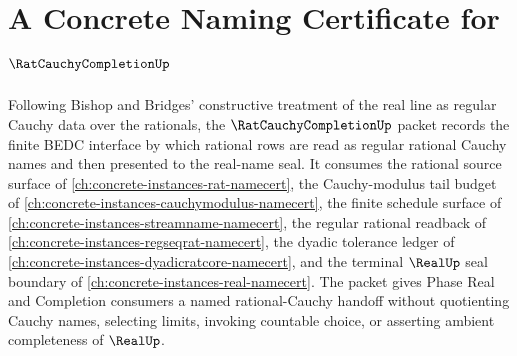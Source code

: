 \chapter{A Concrete Naming Certificate for $\RatCauchyCompletionUp$}
\label{ch:concrete-instances-rat-cauchy-completion-namecert}

Following Bishop and Bridges' constructive treatment of the real line as regular Cauchy data over the rationals, the $\RatCauchyCompletionUp$ packet records the finite BEDC interface by which rational rows are read as regular rational Cauchy names and then presented to the real-name seal. It consumes the rational source surface of \autoref{ch:concrete-instances-rat-namecert}, the Cauchy-modulus tail budget of \autoref{ch:concrete-instances-cauchymodulus-namecert}, the finite schedule surface of \autoref{ch:concrete-instances-streamname-namecert}, the regular rational readback of \autoref{ch:concrete-instances-regseqrat-namecert}, the dyadic tolerance ledger of \autoref{ch:concrete-instances-dyadicratcore-namecert}, and the terminal $\RealUp$ seal boundary of \autoref{ch:concrete-instances-real-namecert}. The packet gives Phase Real and Completion consumers a named rational-Cauchy handoff without quotienting Cauchy names, selecting limits, invoking countable choice, or asserting ambient completeness of $\RealUp$.


